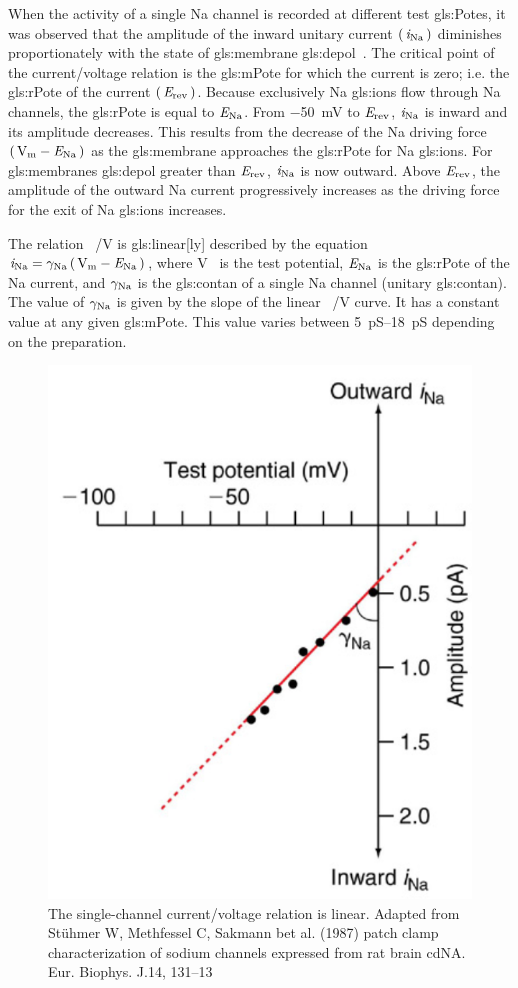 \documentclass[class={myRUCProject}, crop=false]{standalone}
\begin{document}
When the activity of a single \gls{Na} channel is recorded at different test \glspl{gls:Pote}, it was observed that the amplitude of the inward unitary current \(\left(\,\mathit{i}_\mathrm{Na}\,\right)\) diminishes proportionately with the state of \gls{gls:membrane} \gls{gls:depol}~\cite{Hammond2015ch4}. 
The critical point of the current/voltage relation is the \gls{gls:mPote} for which the current is zero; i.e. the \gls{gls:rPote} of the current \(\left(\,\mathit{E}_\mathrm{rev}\,\right)\). 
Because exclusively \gls{Na} \glspl{gls:ion} flow through \gls{Na} channels, the \gls{gls:rPote} is equal to \(\mathit{E}_\mathrm{Na}\). 
From \qty{-50}{\mV} to \(\mathit{E}_\mathrm{rev}\), \(\mathit{i}_\mathrm{Na}\) is inward and its amplitude decreases. This results from the decrease of the \gls{Na} driving force \(\br{\unit{\V\membrane}-\equi\sodium}\) as the \gls{gls:membrane} approaches the \gls{gls:rPote} for \gls{Na} \glspl{gls:ion}. 
For \glspl{gls:membrane} \gls{gls:depol} greater than \(\mathit{E}_\mathrm{rev}\), \(\mathit{i}_\mathrm{Na}\) is now outward. Above \(\mathit{E}_\mathrm{rev}\), the amplitude of the outward \gls{Na} current progressively increases as the driving force for the exit of \gls{Na} \glspl{gls:ion} increases. 

The relation \unit[per-mode = symbol]{\ucur\sodium\per\V} is \gls{gls:linear}[ly] described by the equation \(\ucur\sodium = \ucon\sodium \br{\unit{\V\membrane}-\equi\sodium}\), where \unit{\V\membrane} is the test potential, \(\mathit{E}_\mathrm{Na}\) is the \gls{gls:rPote} of the \gls{Na} current, and \(\gamma_\mathrm{Na}\) is the \gls{gls:contan} of a single \gls{Na} channel (unitary \gls{gls:contan}). The value of \(\gamma_\mathrm{Na}\) is given by the slope of the linear \unit[per-mode = symbol]{\ucur\sodium\per\V} curve. It has a constant value at any given \gls{gls:mPote}. This value varies between \qtyrange{5}{18}{\pico\siemens} depending on the preparation.

\begin{figure}[H]
  \centering
  \includegraphics[width=0.5\linewidth]{Pictures//Anakin/iNa-VNa.png}
  \caption{The single-channel current/voltage \br{\unit[per-mode = symbol]{\ucur\sodium\per\volt}} relation is linear. Adapted from Stühmer W, Methfessel C, Sakmann bet al. (1987) patch clamp characterization of sodium channels expressed from rat brain cdNA. Eur. Biophys. J.14, 131–13 }
  \label{fig:NaVNa}
\end{figure}
\end{document}
